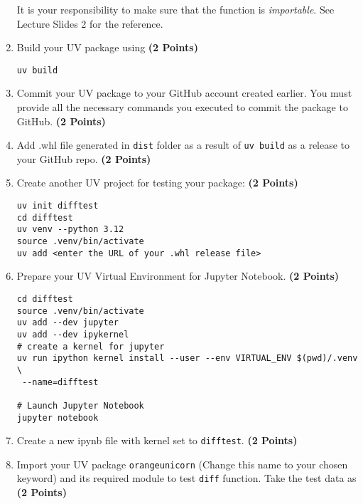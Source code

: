 \documentclass[12pt, xcolor=dvipsnames,svgnames,x11names]{article}
\begin{document}
\begin{enumerate}
It is your responsibility to make sure that the function is \textit{importable}. See Lecture Slides 2 for the reference.

\item Build your UV package using \hfill \textbf{(2 Points)}

\begin{verbatim}
uv build
\end{verbatim}

\item Commit your UV package to your GitHub account created earlier. You must provide all the necessary commands you executed to commit the package to GitHub. \hfill \textbf{(2 Points)}

\item Add .whl file generated in \texttt{dist} folder as a result of \texttt{uv build} as a release to your GitHub repo. \hfill \textbf{(2 Points)}

\item Create another UV project for testing your package: \hfill \textbf{(2 Points)}

\begin{verbatim}
uv init difftest
cd difftest
uv venv --python 3.12
source .venv/bin/activate
uv add <enter the URL of your .whl release file>
\end{verbatim}

\item Prepare your UV Virtual Environment for Jupyter Notebook. \hfill \textbf{(2 Points)}

\begin{verbatim}
cd difftest
source .venv/bin/activate
uv add --dev jupyter
uv add --dev ipykernel
# create a kernel for jupyter
uv run ipython kernel install --user --env VIRTUAL_ENV $(pwd)/.venv \
 --name=difftest

# Launch Jupyter Notebook
jupyter notebook
\end{verbatim}

\item Create a new ipynb file with kernel set to \texttt{difftest}. \hfill \textbf{(2 Points)}
\item Import your UV package \texttt{orangeunicorn} (Change this name to your chosen keyword) and its required module to test \texttt{diff} function. Take the test data as \hfill \textbf{(2 Points)}



\end{enumerate}
\end{document}
